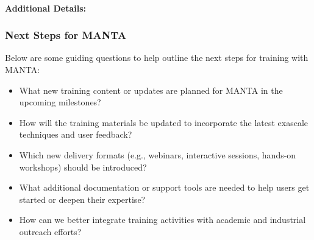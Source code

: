 \paragraph{Additional Details:}


\subsubsection{Next Steps for MANTA}
\label{sec:MANTA:next-steps}

Below are some guiding questions to help outline the next steps for training with MANTA:
\begin{itemize}
    \item What new training content or updates are planned for MANTA in the upcoming milestones?
    \item How will the training materials be updated to incorporate the latest exascale techniques and user feedback?
    \item Which new delivery formats (e.g., webinars, interactive sessions, hands-on workshops) should be introduced?
    \item What additional documentation or support tools are needed to help users get started or deepen their expertise?
    \item How can we better integrate training activities with academic and industrial outreach efforts?
\end{itemize}